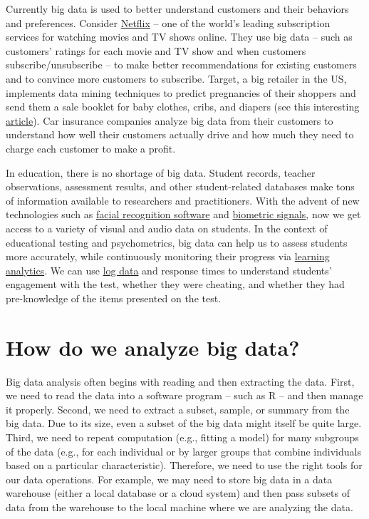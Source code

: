 \documentclass[
]{book}
\begin{document}
Currently big data is used to better understand customers and their behaviors and preferences. Consider \href{https://www.netflix.com}{Netflix} -- one of the world's leading subscription services for watching movies and TV shows online. They use big data -- such as customers' ratings for each movie and TV show and when customers subscribe/unsubscribe -- to make better recommendations for existing customers and to convince more customers to subscribe. Target, a big retailer in the US, implements data mining techniques to predict pregnancies of their shoppers and send them a sale booklet for baby clothes, cribs, and diapers (see this interesting \href{https://www.driveresearch.com/single-post/2016/12/06/How-Target-Used-Data-Analytics-to-Predict-Pregnancies}{article}). Car insurance companies analyze big data from their customers to understand how well their customers actually drive and how much they need to charge each customer to make a profit.

In education, there is no shortage of big data. Student records, teacher observations, assessment results, and other student-related databases make tons of information available to researchers and practitioners. With the advent of new technologies such as \href{https://www.edweek.org/ew/articles/2016/01/13/the-future-of-big-data-and-analytics.html}{facial recognition software} and \href{https://www.smartdatacollective.com/jay-z-kanye-west-used-biometrics-beat-album-leaks/}{biometric signals}, now we get access to a variety of visual and audio data on students. In the context of educational testing and psychometrics, big data can help us to assess students more accurately, while continuously monitoring their progress via \href{https://isit.arts.ubc.ca/learning-analytics-examples/}{learning analytics}. We can use \href{https://link.springer.com/content/pdf/10.1007\%2Fs41237-018-0063-y.pdf}{log data} and response times to understand students' engagement with the test, whether they were cheating, and whether they had pre-knowledge of the items presented on the test.

\hypertarget{how-do-we-analyze-big-data}{%
\section{How do we analyze big data?}\label{how-do-we-analyze-big-data}}

Big data analysis often begins with reading and then extracting the data. First, we need to read the data into a software program -- such as R -- and then manage it properly. Second, we need to extract a subset, sample, or summary from the big data. Due to its size, even a subset of the big data might itself be quite large. Third, we need to repeat computation (e.g., fitting a model) for many subgroups of the data (e.g., for each individual or by larger groups that combine individuals based on a particular characteristic). Therefore, we need to use the right tools for our data operations. For example, we may need to store big data in a data warehouse (either a local database or a cloud system) and then pass subsets of data from the warehouse to the local machine where we are analyzing the data.
\end{document}
